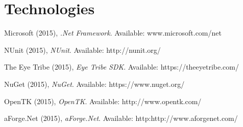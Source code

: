 \documentclass[a4paper,12pt]{report}
\begin{document}
\section{Technologies}
	
\begin{thebibliography}{99}
  Microsoft (2015),
  \emph{.Net Framework}.
  Available: www.microsoft.com/net
  
  NUnit (2015),
  \emph{NUnit}.
  Available: http://nunit.org/ 
  
  The Eye Tribe (2015),
  \emph{Eye Tribe SDK}.
  Available: https://theeyetribe.com/
  
  NuGet (2015),
  \emph{NuGet}.
  Available: https://www.nuget.org/   
  
  OpenTK (2015),
  \emph{OpenTK}.
  Available: http://www.opentk.com/
  
  aForge.Net (2015),
  \emph{aForge.Net}.
  Available: http:http://www.aforgenet.com/
  	

  	
\end{thebibliography}
\end{document}
